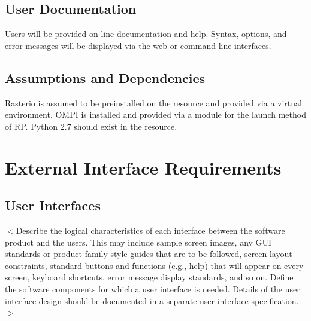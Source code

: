 \documentclass{scrreprt}
\begin{document}
\section{User Documentation}

Users will be provided on-line documentation and help.  Syntax, options, and error
messages will be displayed via the web or command line interfaces.

\section{Assumptions and Dependencies}

Rasterio is assumed to be preinstalled on the resource and provided via a virtual
environment. OMPI is installed and provided via a module for the launch method of 
RP. Python 2.7 should exist in the resource.

\chapter{External Interface Requirements}

\section{User Interfaces}
$<$Describe the logical characteristics of each interface between the software 
product and the users. This may include sample screen images, any GUI standards 
or product family style guides that are to be followed, screen layout 
constraints, standard buttons and functions (e.g., help) that will appear on 
every screen, keyboard shortcuts, error message display standards, and so on.  
Define the software components for which a user interface is needed. Details of 
the user interface design should be documented in a separate user interface 
specification.$>$
\end{document}
